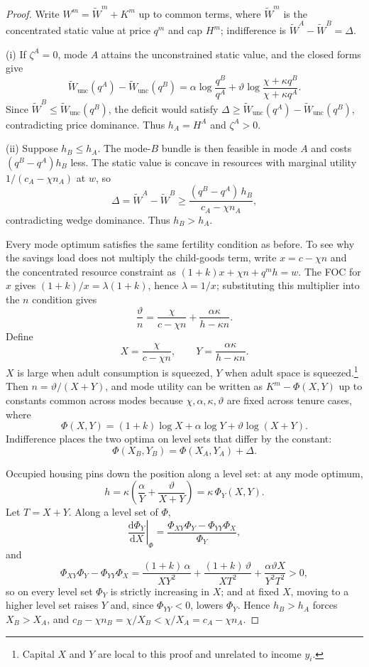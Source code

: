 \documentclass[11pt]{article}
\newcommand{\dd}{\mathrm d}
\newcommand{\1}{\mathbf 1}
\begin{document}
\begin{proof}
Write $W^m=\tilde W^m+K^m$ up to common terms, where $\tilde W^m$ is the concentrated static value at price $q^m$ and cap $H^m$; indifference is $\tilde W^A-\tilde W^B=\Delta$.

(i) If $\zeta^A=0$, mode $A$ attains the unconstrained static value, and the closed forms give
\[
\tilde W_{\mathrm{unc}}(q^A)-\tilde W_{\mathrm{unc}}(q^B)
=
\alpha\log\frac{q^B}{q^A}+\vartheta\log\frac{\chi+\kappa q^B}{\chi+\kappa q^A}.
\]
Since $\tilde W^B\le\tilde W_{\mathrm{unc}}(q^B)$, the deficit would satisfy $\Delta\ge\tilde W_{\mathrm{unc}}(q^A)-\tilde W_{\mathrm{unc}}(q^B)$, contradicting price dominance. Thus $h_A=H^A$ and $\zeta^A>0$.

(ii) Suppose $h_B\le h_A$. The mode-$B$ bundle is then feasible in mode $A$ and costs $(q^B-q^A)h_B$ less. The static value is concave in resources with marginal utility $1/(c_A-\chi n_A)$ at $w$, so
\[
\Delta=\tilde W^A-\tilde W^B
\ge
\frac{(q^B-q^A)\,h_B}{c_A-\chi n_A},
\]
contradicting wedge dominance. Thus $h_B>h_A$.

Every mode optimum satisfies the same fertility condition as before. To see why the savings load does not multiply the child-goods term, write $x=c-\chi n$ and the concentrated resource constraint as $(1+k)x+\chi n+q^m h=w$. The FOC for $x$ gives $(1+k)/x=\lambda(1+k)$, hence $\lambda=1/x$; substituting this multiplier into the $n$ condition gives
\[
\frac{\vartheta}{n}=\frac{\chi}{c-\chi n}+\frac{\alpha\kappa}{h-\kappa n}.
\]
Define
\[
X=\frac{\chi}{c-\chi n},
\qquad
Y=\frac{\alpha\kappa}{h-\kappa n}.
\]
$X$ is large when adult consumption is squeezed, $Y$ when adult space is squeezed.\footnote{Capital $X$ and $Y$ are local to this proof and unrelated to income $y_i$.}
Then $n=\vartheta/(X+Y)$, and mode utility can be written as $K^m-\Phi(X,Y)$ up to constants common across modes because $\chi,\alpha,\kappa,\vartheta$ are fixed across tenure cases, where
\[
\Phi(X,Y)=(1+k)\log X+\alpha\log Y+\vartheta\log(X+Y).
\]
Indifference places the two optima on level sets that differ by the constant:
\[
\Phi(X_B,Y_B)=\Phi(X_A,Y_A)+\Delta.
\]

Occupied housing pins down the position along a level set: at any mode optimum,
\[
h
=
\kappa\left(\frac{\alpha}{Y}+\frac{\vartheta}{X+Y}\right)
=
\kappa\,\Phi_Y(X,Y).
\]
Let $T=X+Y$. Along a level set of $\Phi$,
\[
\left.\frac{\dd \Phi_Y}{\dd X}\right|_\Phi
=
\frac{\Phi_{XY}\Phi_Y-\Phi_{YY}\Phi_X}{\Phi_Y},
\]
and
\[
\Phi_{XY}\Phi_Y-\Phi_{YY}\Phi_X
=
\frac{(1+k)\,\alpha}{XY^2}
+
\frac{(1+k)\,\vartheta}{XT^2}
+
\frac{\alpha\vartheta X}{Y^2T^2}
>0,
\]
so on every level set $\Phi_Y$ is strictly increasing in $X$; and at fixed $X$, moving to a higher level set raises $Y$ and, since $\Phi_{YY}<0$, lowers $\Phi_Y$. Hence $h_B>h_A$ forces $X_B>X_A$, and $c_B-\chi n_B=\chi/X_B<\chi/X_A=c_A-\chi n_A$.


\end{proof}
\end{document}
